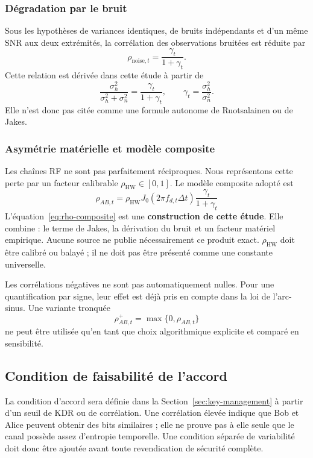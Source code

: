 \documentclass[conference,a4paper]{IEEEtran}
\begin{document}
\subsubsection{Dégradation par le bruit}
Sous les hypothèses de variances identiques, de bruits indépendants et d'un même SNR aux deux extrémités, la corrélation des observations bruitées est réduite par
\begin{equation}
    \rho_{\mathrm{noise},t}=\frac{\gamma_t}{1+\gamma_t}.
    \label{eq:rho-noise}
\end{equation}
Cette relation est dérivée dans cette étude à partir de
\begin{equation}
\frac{\sigma_h^2}{\sigma_h^2+\sigma_n^2}
=\frac{\gamma_t}{1+\gamma_t},
\qquad \gamma_t=\frac{\sigma_h^2}{\sigma_n^2}.
\end{equation}
Elle n'est donc pas citée comme une formule autonome de Ruotsalainen ou de Jakes.

\subsubsection{Asymétrie matérielle et modèle composite}
Les chaînes RF ne sont pas parfaitement réciproques. Nous représentons cette perte par un facteur calibrable $\rho_{\mathrm{HW}}\in[0,1]$. Le modèle composite adopté est
\begin{equation}
\boxed{
\rho_{AB,t}=\rho_{\mathrm{HW}}J_0(2\pi f_{d,t}\Delta t)
\frac{\gamma_t}{1+\gamma_t}}
\label{eq:rho-composite}
\end{equation}
L'équation~\eqref{eq:rho-composite} est une \textbf{construction de cette étude}. Elle combine : le terme de Jakes, la dérivation du bruit et un facteur matériel empirique. Aucune source ne publie nécessairement ce produit exact. $\rho_{\mathrm{HW}}$ doit être calibré ou balayé ; il ne doit pas être présenté comme une constante universelle.

Les corrélations négatives ne sont pas automatiquement nulles. Pour une quantification par signe, leur effet est déjà pris en compte dans la loi de l'arc-sinus. Une variante tronquée
\begin{equation}
    \rho_{AB,t}^{+}=\max\{0,\rho_{AB,t}\}
\end{equation}
ne peut être utilisée qu'en tant que choix algorithmique explicite et comparé en sensibilité.

\subsection{Condition de faisabilité de l'accord}
La condition d'accord sera définie dans la Section~\ref{sec:key-management} à partir d'un seuil de KDR ou de corrélation. Une corrélation élevée indique que Bob et Alice peuvent obtenir des bits similaires ; elle ne prouve pas à elle seule que le canal possède assez d'entropie temporelle. Une condition séparée de variabilité doit donc être ajoutée avant toute revendication de sécurité complète.
\end{document}
